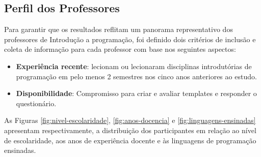 \subsection{Perfil dos Professores}
Para garantir que os resultados reflitam um panorama representativo dos professores de Introdução a programação, foi definido dois critérios de inclusão e coleta de informação para cada professor com base nos seguintes aspectos: 

\begin{itemize}
    \item \textbf{Experiência recente}: lecionam ou lecionaram disciplinas introdutórias de programação em pelo menos 2 semestres nos cinco anos anteriores ao estudo.
    \item \textbf{Disponibilidade}: Compromisso para criar e avaliar templates e responder o questionário.
\end{itemize}

As Figuras \ref{fig:nivel-escolaridade}, \ref{fig:anos-docencia} e \ref{fig:linguagens-ensinadas} apresentam respectivamente, a distribuição dos participantes em relação ao nível de escolaridade, aos anos de experiência docente e às linguagens de programação ensinadas.

